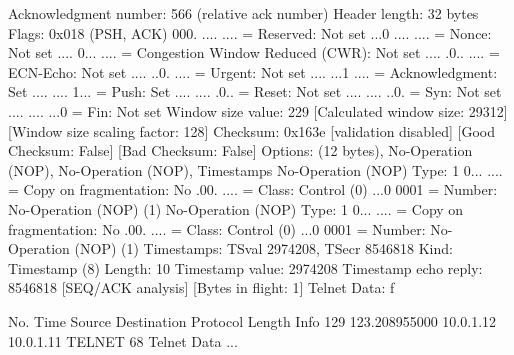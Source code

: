     Acknowledgment number: 566    (relative ack number)
    Header length: 32 bytes
    Flags: 0x018 (PSH, ACK)
        000. .... .... = Reserved: Not set
        ...0 .... .... = Nonce: Not set
        .... 0... .... = Congestion Window Reduced (CWR): Not set
        .... .0.. .... = ECN-Echo: Not set
        .... ..0. .... = Urgent: Not set
        .... ...1 .... = Acknowledgment: Set
        .... .... 1... = Push: Set
        .... .... .0.. = Reset: Not set
        .... .... ..0. = Syn: Not set
        .... .... ...0 = Fin: Not set
    Window size value: 229
    [Calculated window size: 29312]
    [Window size scaling factor: 128]
    Checksum: 0x163e [validation disabled]
        [Good Checksum: False]
        [Bad Checksum: False]
    Options: (12 bytes), No-Operation (NOP), No-Operation (NOP), Timestamps
        No-Operation (NOP)
            Type: 1
                0... .... = Copy on fragmentation: No
                .00. .... = Class: Control (0)
                ...0 0001 = Number: No-Operation (NOP) (1)
        No-Operation (NOP)
            Type: 1
                0... .... = Copy on fragmentation: No
                .00. .... = Class: Control (0)
                ...0 0001 = Number: No-Operation (NOP) (1)
        Timestamps: TSval 2974208, TSecr 8546818
            Kind: Timestamp (8)
            Length: 10
            Timestamp value: 2974208
            Timestamp echo reply: 8546818
    [SEQ/ACK analysis]
        [Bytes in flight: 1]
Telnet
    Data: f

No.     Time           Source                Destination           Protocol Length Info
    129 123.208955000  10.0.1.12             10.0.1.11             TELNET   68     Telnet Data ...

